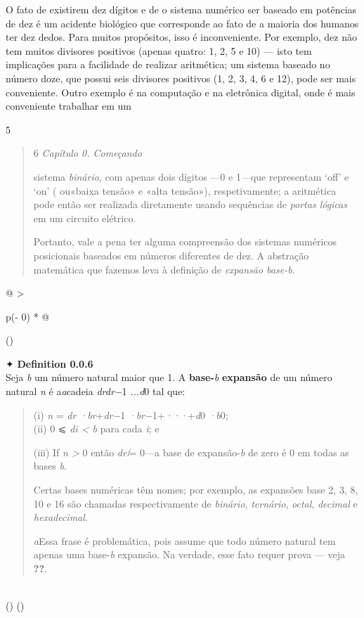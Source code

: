 \documentclass[
]{article}
\begin{document}
O fato de existirem dez dígitos e de o sistema numérico ser baseado em
potências de dez é um acidente biológico que corresponde ao fato de a
maioria dos humanos ter dez dedos. Para muitos propósitos, isso é
inconveniente. Por exemplo, dez não tem muitos divisores positivos
(apenas quatro: 1, 2, 5 e 10) --- isto tem implicações para a facilidade
de realizar aritmética; um sistema baseado no número doze, que possui
seis divisores positivos (1, 2, 3, 4, 6 e 12), pode ser mais
conveniente. Outro exemplo é na computação e na eletrônica digital, onde
é mais conveniente trabalhar em um

5

\begin{quote}
6 \emph{Capítulo 0. Começando}

sistema \emph{binário}, com apenas dois dígitos ---0 e 1---que
representam `off' e `on' ( ou«baixa tensão» e «alta tensão»),
respetivamente; a aritmética pode então ser realizada diretamente usando
sequências de \emph{portas lógicas} em um circuito elétrico.

Portanto, vale a pena ter alguma compreensão dos sistemas numéricos
posicionais baseados em números diferentes de dez. A abstração
matemática que fazemos leva à definição de \emph{expansão base-b}.
\end{quote}

\begin{longtable}[]{@{}
  >{\raggedright\arraybackslash}p{(\columnwidth - 0\tabcolsep) * }@{}}
\toprule()
\begin{minipage}[b]{\linewidth}\raggedright
✦ \textbf{Definition 0.0.6}\\
Seja \emph{b} um número natural maior que 1. A \textbf{base-}\emph{b}
\textbf{expansão} de um número natural \emph{n} é a\emph{a}cadeia
\emph{drdr−}1 \emph{...d}0 tal que:

\begin{quote}
(i) \emph{n} = \emph{dr ·br}+\emph{dr−}1
\emph{·br−}1+\emph{···}+\emph{d}0 \emph{·b}0;\\
(ii) 0 ⩽ \emph{di \textless{} b} para cada \emph{i}; e

(iii) If \emph{n \textgreater{}} 0 então \emph{dr ̸}= 0---a base de
expansão-\emph{b} de zero é 0 em todas as bases \emph{b}.

Certas bases numéricas têm nomes; por exemplo, as expansões base 2, 3,
8, 10 e 16 são chamadas respectivamente de \emph{binário},
\emph{ternário}, \emph{octal}, \emph{decimal} e \emph{hexadecimal}.

\emph{a}Essa frase é problemática, pois assume que todo número natural
tem apenas uma base-\emph{b} expansão. Na verdade, esse fato requer
prova --- veja \textbf{??}.
\end{quote}\strut
\end{minipage} \\
\midrule()
\endhead
\bottomrule()
\end{longtable}
\end{document}
